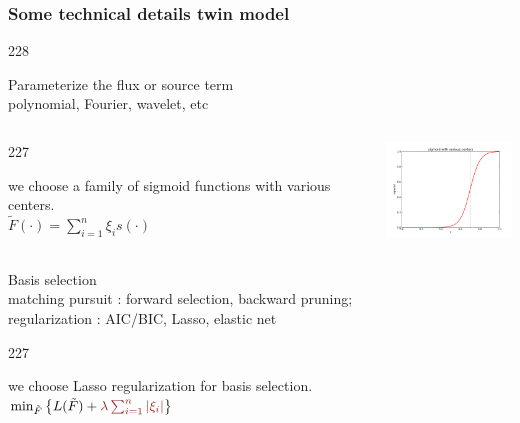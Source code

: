 \documentclass{beamer}
\let\oldcite=\cite
\renewcommand{\cite}[1]{\textcolor[rgb]{.4,.4,.85}{\oldcite{#1}}}
\newcommand{\barrow}{\item[\color{darkred}\ding{228}]}
\newcommand{\carrow}{\item[\color{darkred}\ding{227}]}
\begin{document}
\setcounter{framenumber}{9}

\begin{frame}
    \frametitle{Some technical details \hfill \scriptsize{twin model}}\small
    \begin{dinglist}{228}
        \barrow Parameterize the flux or source term \\\vspace{.05cm} \scriptsize polynomial, Fourier, wavelet, etc\\
        \small
        \vspace{-.3cm}
        \begin{columns}
            \begin{dinglist}{227}
                \carrow we choose a family of sigmoid functions with various centers.\\\scriptsize
                        $
                            \tilde{F}(\cdot) = \sum_{i=1}^n \xi_i s(\cdot)
                        $
            \end{dinglist}
            \small
            \includegraphics[width=3.5cm]{sigmoid_4.png}
        \end{columns}
        \barrow Basis selection\\\vspace{.05cm}
            \scriptsize matching pursuit \cite{Adler 96, Billing07}: forward selection, backward pruning;\\
            regularization \cite{Stone 77, Schwarz 78, Tibshirani 96}: AIC/BIC, Lasso, elastic net
            \small\vspace{.16cm}
            \begin{dinglist}{227}
                \carrow we choose Lasso regularization for basis selection.\scriptsize\\
                $
                    \min_{\tilde{F}} \left\{ L(\tilde{F})+\textcolor{darkred}{\lambda\sum_{i=1}^n\left| \xi_i \right|}\right\}
                $
            \end{dinglist}
    \end{dinglist}
\end{frame}
\end{document}
